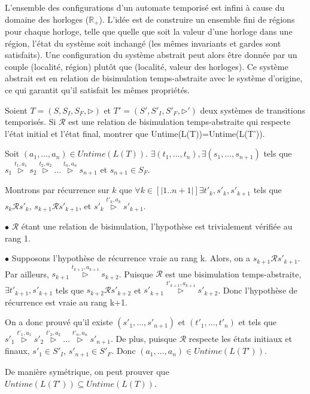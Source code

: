 \documentclass[a4paper]{article}
\begin{document}
\begin{questions}
\begin{correction}{.8}
L'ensemble des configurations d'un automate temporisé est infini à
cause du domaine des horloges ($\mathbb{R}_+$). L'idée est de
construire un ensemble fini de régions pour chaque horloge, telle que
quelle que soit la valeur d'une horloge dans une région, l'état du
système soit inchangé (les mêmes invariants et gardes sont
satisfaits). Une configuration du système abstrait peut alors être donnée par
un couple (localité, région) plutôt que (localité, valeur des
horloges). Ce système abstrait est en relation de bisimulation
temps-abstraite avec le système d'origine, ce qui garantit qu'il
satisfait les mêmes propriétés.
\end{correction}

\question Soient $T=(S,S_I,S_F,\rhd )$ et $T'=(S',S'_I,S'_F,\rhd')$ deux systèmes de transitions temporisés. Si $\mathcal{R}$ est une
	relation de bisimulation temps-abstraite qui respecte l'état
        initial et l'état final, montrer que \linebreak
        Untime(L(T))=Untime(L(T')). 
\end{questions}

\begin{correction}{.8}
Soit $(a_1,\ldots, a_n)\in Untime(L(T))$. 
$\exists (t_1,\ldots , t_n), \exists (s_1,\ldots,s_{n+1})$ tels que
$s_1\overset{t_1,a_1}{\rhd}s_2 \overset{t_2,a_2}{\rhd} \ldots
\overset{t_n,a_n}{\rhd}s_{n+1}$ et $s_{n+1}\in S_F$. 

Montrons par récurrence sur $k$ que $\forall k\in [|1..n+1|] \exists
t'_k,s'_k,s'_{k+1}$ tels que $s_k\mathcal{R} s'_k$,
$s_{k+1}\mathcal{R} s'_{k+1}$, et $s'_k\overset{t'_k,a_k}{\rhd}s'_{k+1}$.

$\bullet$ $\mathcal{R}$ étant une relation de bisimulation, l'hypothèse est
trivialement vérifiée au rang 1.
 
$\bullet$ Supposons l'hypothèse de récurrence vraie au rang k. Alors, on a
$s_{k+1}\mathcal{R} s'_{k+1}$. Par ailleurs,
$s_{k+1}\overset{t_{k+1},a_{k+1}}{\rhd}s_{k+2}$. Puisque $\mathcal{R}$ est une
bisimulation temps-abstraite, $\exists t'_{k+1}, s'_{k+1}$ tels que
$s_{k+2}\mathcal{R}s'_{k+2}$ et  $s'_{k+1}\overset{t'_{k+1},a_{k+1}}{\rhd}s'_{k+2}$.
Donc l'hypothèse de récurrence est vraie au rang k+1.

On a donc prouvé qu'il existe $(s'_1, \ldots, s'_{n+1})$ et
$(t'_1,\ldots , t'_n)$ et tels que $s'_1\overset{t'_1,a_1}{\rhd}s'_2
\overset{t'_2,a_2}{\rhd} \ldots \overset{t'_n,a_n}{\rhd}s'_{n+1}$. De
plus, puisque $\mathcal{R}$ respecte les états initiaux et finaux,
$s'_1\in S'_I$, $s'_{n+1}\in S'_F$. Donc $(a_1,\ldots, a_n)\in
Untime(L(T'))$.

De manière symétrique, on peut prouver que  $Untime(L(T')) \subseteq  Untime(L(T))$.
\end{correction}
\end{document}
